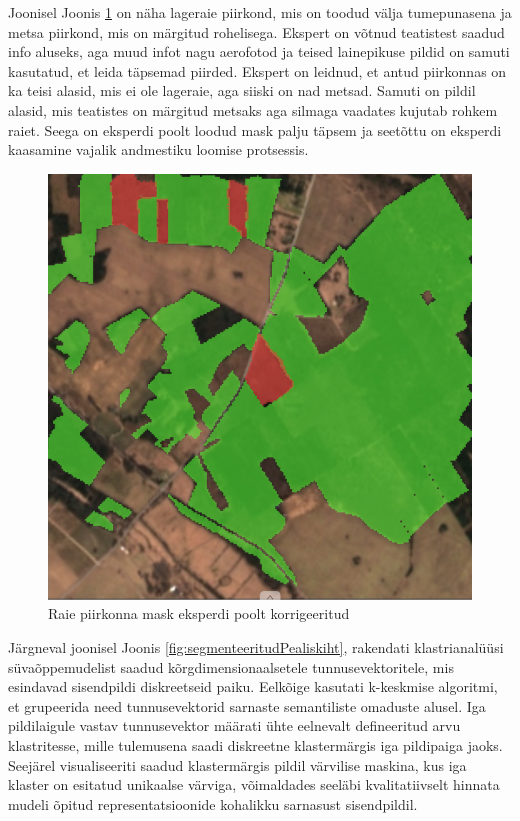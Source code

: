Joonisel Joonis \ref{fig:raieInfoMask_ekspert} on näha lageraie piirkond, mis on toodud välja tumepunasena ja metsa piirkond, mis on märgitud rohelisega. Ekspert on võtnud teatistest saadud info aluseks, aga muud infot nagu aerofotod ja teised lainepikuse pildid on samuti kasutatud, et leida täpsemad piirded. Ekspert on leidnud, et antud piirkonnas on ka teisi alasid, mis ei ole lageraie, aga siiski on nad metsad. Samuti on pildil alasid, mis teatistes on märgitud metsaks aga silmaga vaadates kujutab rohkem raiet. Seega on eksperdi poolt loodud mask palju täpsem ja seetõttu on eksperdi kaasamine vajalik andmestiku loomise protsessis.

\begin{figure}[H]
    \centering
    \includegraphics[width=.7\textwidth]{figures/seose_leidmine/raieInfoMask_ekspert.png}
    \caption{Raie piirkonna mask eksperdi poolt korrigeeritud}
    \label{fig:raieInfoMask_ekspert}
\end{figure}

Järgneval joonisel Joonis \ref{fig:segmenteeritudPealiskiht}, rakendati klastrianalüüsi süvaõppemudelist saadud
kõrgdimensionaalsetele tunnusevektoritele, mis esindavad sisendpildi
diskreetseid paiku. Eelkõige kasutati k-keskmise algoritmi, et grupeerida need
tunnusevektorid sarnaste semantiliste omaduste alusel. Iga pildilaigule vastav
tunnusevektor määrati ühte eelnevalt defineeritud arvu klastritesse, mille
tulemusena saadi diskreetne klastermärgis iga pildipaiga jaoks. Seejärel
visualiseeriti saadud klastermärgis pildil värvilise maskina, kus iga klaster on
esitatud unikaalse värviga, võimaldades seeläbi kvalitatiivselt hinnata mudeli
õpitud representatsioonide kohalikku sarnasust sisendpildil.

